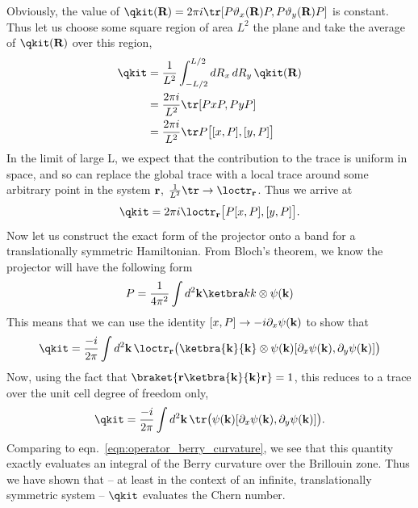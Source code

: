 Obviously, the value of $\qkit(\textbf R) = 2\pi i\tr [P \vartheta_x(\textbf R) P, P \vartheta_y(\textbf R)P ]$ is constant. Thus let us choose some square region of area $L^2$ the plane and take the average of $\qkit(\textbf R)$ over this region, 
\begin{align}
    \qkit &= \frac{1}{L^2} \int_{-L/2}^{L/2} dR_x\, dR_y\, \qkit(\textbf R)  \\ 
    & = \frac{2\pi i}{L^2} \tr [ PxP, PyP ] \\ 
    & = \frac{2\pi i}{L^2} \tr P \big[ [x,P],[y,P] \big ] 
\end{align}
In the limit of large L, we expect that the contribution to the trace is uniform in space, and so can replace the global trace with a local trace around some arbitrary point in the system $\textbf r$, $\frac1 {L^2} \tr \rightarrow \loctr_{\textbf{r}} $. Thus we arrive at 
\begin{align}
    \qkit = 2\pi i \loctr _{\textbf{r}} \big [P[x,P],[y,P]\big ]. 
\end{align}
Now let us construct the exact form of the projector onto a band for a translationally symmetric Hamiltonian. From Bloch's theorem, we know the projector will have the following form
\begin{align}
    P = \frac{1}{4\pi^2}\int d^2 \textbf k \ketbra k k \otimes \psi(\textbf k)
\end{align}
This means that we can use the identity $[x, P] \rightarrow -i \partial_x \psi(\textbf k)$ to show that 
\begin{align}
    \qkit = \frac{-i}{2\pi} \int d^2 \textbf k \, 
    \loctr _{\textbf{r}} \big (\ketbra {\textbf k} {\textbf k} \otimes
        \psi(\textbf k) [\partial_x \psi(\textbf k), \partial_y \psi(\textbf k)]
    \big )
\end{align}
Now, using the fact that $ \braket{\textbf r \ketbra{\textbf k}{\textbf k}  \textbf r}  = 1$, this reduces to a trace over the unit cell degree of freedom only,
\begin{align}
    \qkit = \frac{-i}{2\pi} \int d^2 \textbf k \, 
    \tr \big (
        \psi(\textbf k) [\partial_x \psi(\textbf k), \partial_y \psi(\textbf k)]
    \big ).
\end{align} 
Comparing to eqn.~\ref{eqn:operator_berry_curvature}, we see that this quantity exactly evaluates an integral of the Berry curvature over the Brillouin zone. Thus we have shown that -- at least in the context of an infinite, translationally symmetric system -- $\qkit$ evaluates the Chern number.

